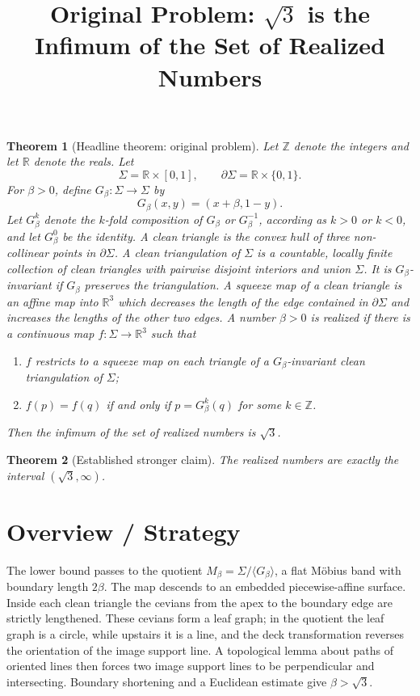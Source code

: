 \documentclass[12pt]{article}
\title{Original Problem: \(\sqrt 3\) is the Infimum of the Set of Realized Numbers}
\date{}
\newcommand{\R}{\mathbb R}
\newcommand{\Z}{\mathbb Z}
\theoremstyle{plain}
\newtheorem{theorem}{Theorem}
\begin{document}
\maketitle

\begin{theorem}[Headline theorem: original problem]\label{thm:headline}
\normalfont
Let \(\Z\) denote the integers and let \(\R\) denote the reals.  Let
\[
\Sigma=\R\times[0,1],\qquad \partial\Sigma=\R\times\{0,1\}.
\]
For \(\beta>0\), define \(G_\beta:\Sigma\to\Sigma\) by
\[
G_\beta(x,y)=(x+\beta,1-y).
\]
Let \(G_\beta^k\) denote the \(k\)-fold composition of \(G_\beta\) or
\(G_\beta^{-1}\), according as \(k>0\) or \(k<0\), and let
\(G_\beta^0\) be the identity.  A \emph{clean triangle} is the convex hull of
three non-collinear points in \(\partial\Sigma\).  A \emph{clean triangulation}
of \(\Sigma\) is a countable, locally finite collection of clean triangles
with pairwise disjoint interiors and union \(\Sigma\).  It is
\(G_\beta\)-\emph{invariant} if \(G_\beta\) preserves the triangulation.  A
\emph{squeeze map} of a clean triangle is an affine map into \(\R^3\) which
decreases the length of the edge contained in \(\partial\Sigma\) and increases
the lengths of the other two edges.  A number \(\beta>0\) is \emph{realized}
if there is a continuous map \(f:\Sigma\to\R^3\) such that
\begin{enumerate}
\item \(f\) restricts to a squeeze map on each triangle of a
\(G_\beta\)-invariant clean triangulation of \(\Sigma\);
\item \(f(p)=f(q)\) if and only if \(p=G_\beta^k(q)\) for some \(k\in\Z\).
\end{enumerate}
Then the infimum of the set of realized numbers is \(\sqrt3\).
\end{theorem}

\begin{theorem}[Established stronger claim]\label{thm:strong}
The realized numbers are exactly the interval \((\sqrt3,\infty)\).
\end{theorem}

\section*{Overview / Strategy}

The lower bound passes to the quotient
\(M_\beta=\Sigma/\langle G_\beta\rangle\), a flat M\"obius band with boundary
length \(2\beta\).  The map descends to an embedded piecewise-affine surface.
Inside each clean triangle the cevians from the apex to the boundary edge are
strictly lengthened.  These cevians form a leaf graph; in the quotient the leaf
graph is a circle, while upstairs it is a line, and the deck transformation
reverses the orientation of the image support line.  A topological lemma about
paths of oriented lines then forces two image support lines to be perpendicular
and intersecting.  Boundary shortening and a Euclidean estimate give
\(\beta>\sqrt3\).
\end{document}
